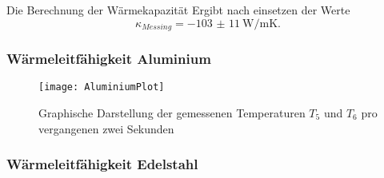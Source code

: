 \noindent Die Berechnung der Wärmekapazität Ergibt nach einsetzen der Werte
\begin{equation}
  \kappa_{Messing} = \qty{-103(11)}{\watt\per\meter\kelvin}.
\end{equation}

\subsubsection{Wärmeleitfähigkeit Aluminium}

\begin{figure}[H]
  \label{abb:ap}
  \centering
  \caption{Graphische Darstellung der gemessenen Temperaturen $T_5$ und $T_6$ pro vergangenen zwei Sekunden}
  \texttt{[image: AluminiumPlot]}
\end{figure}

\subsubsection{Wärmeleitfähigkeit Edelstahl}

